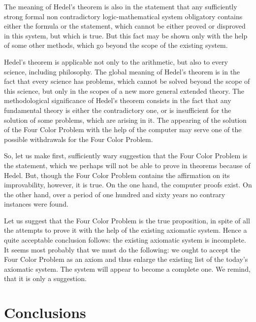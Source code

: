 \documentclass{amsart}
\theoremstyle{plain}
\numberwithin{equation}{section}
\begin{document}
The meaning of Hedel's theorem is also in the statement that any sufficiently strong formal non contradictory logic-mathematical system obligatory contains either the formula or the statement, which cannot be either proved or disproved in this system, but which is true. But this fact may be shown only with the help of some other methods, which go beyond the scope of the existing system. 

Hedel's theorem is applicable not only to the arithmetic, but also to every science, including philosophy. The global meaning of Hedel's theorem is in the fact that every science has problems, which cannot be solved beyond the scope of this science, but only in the scopes of a new more general extended theory. The methodological significance of Hedel's theorem consists in the fact that any fundamental theory is either the contradictory one, or is insufficient for the solution of some problems, which are arising in it. The appearing of the solution of the Four Color Problem with the help of the computer may serve one of the possible withdrawals for the Four Color Problem.

So, let us make first, sufficiently wary suggestion that the Four Color Problem is the statement, which we perhaps will not be able to prove in theorems because of Hedel. But, though the Four Color Problem contains the affirmation on its improvability, however, it is true. On the one hand, the computer proofs exist. On the other hand, over a period of one hundred and sixty years no contrary instances were found.

Let us suggest that the Four Color Problem is the true proposition, in spite of all the attempts to prove it with the help of the existing axiomatic system. Hence a quite acceptable conclusion follows: the existing axiomatic system is incomplete. It seems most probably that we must do the following: we ought to accept the Four Color Problem as an axiom and thus enlarge the existing list of the today's axiomatic system. The system will appear to become a complete one. We remind, that it is only a suggestion.

\section {Conclusions}
\end{document}
